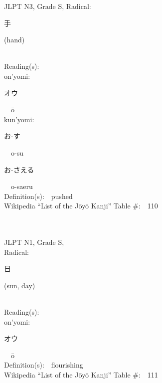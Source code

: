 \begin{multicols}{2}
{JLPT N3, Grade S, Radical:\ \ {\begin{CJK}{UTF8}{min} 手 \end{CJK}} (hand) } \\
Reading(s):\ \ \\
{\hspace*{1em}}on'yomi:\ \ \\
{\hspace*{2em}}{\begin{CJK}{UTF8}{min} オウ \end{CJK}}\ \ \=o\ \ \\
{\hspace*{1em}}kun'yomi:\ \ \\
{\hspace*{2em}}{\begin{CJK}{UTF8}{min} お-す \end{CJK}}\ \ o-su\ \ \\
{\hspace*{2em}}{\begin{CJK}{UTF8}{min} お-さえる \end{CJK}}\ \ o-saeru\ \ \\
Definition(s):\ \ pushed \\
Wikipedia ``List of the J\=oy\=o Kanji'' Table \#:\ \ 110 \\
\ \ \\
{\fontsize{34pt}{40pt}  }\ \ \\
{JLPT N1, Grade S, \\Radical:\ \ {\begin{CJK}{UTF8}{min} 日 \end{CJK}} (sun, day) } \\
Reading(s):\ \ \\
{\hspace*{1em}}on'yomi:\ \ \\
{\hspace*{2em}}{\begin{CJK}{UTF8}{min} オウ \end{CJK}}\ \ \=o\ \ \\
Definition(s):\ \ flourishing \\
Wikipedia ``List of the J\=oy\=o Kanji'' Table \#:\ \ 111 \\
\ \ \\
{\fontsize{34pt}{40pt}  }\ \ \\  %

\end{multicols}
